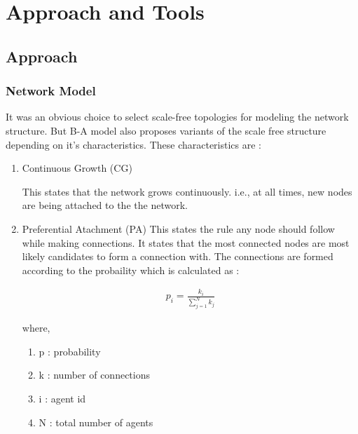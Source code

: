 
\chapter{Approach and Tools} %

\label{Chapter2} %



\section{Approach}


\subsection{Network Model}
\label{sec:model}
It was an obvious choice to select scale-free topologies for modeling the network structure.  But B-A model also proposes variants of the scale free structure depending on it's characteristics. These characteristics are : 

\begin{enumerate}
\item Continuous Growth (CG)

This states that the network grows continuously. i.e., at all times, new nodes are being attached to the the network.


\item Preferential Atachment (PA)
This states the rule any node should follow while making connections. It states that the most connected nodes are most likely candidates to form a connection with.
The connections are formed according to the probaility which is calculated as :

\begin{eqnarray}
 p_i = \frac{k_i}{\sum_{j=1}^{N} k_j} 
\label{eqn:PA}
\end{eqnarray}


where, 

\begin{enumerate}
\item p : probability 
\item k : number of connections 
\item i : agent id 
\item N : total number of agents 
\end{enumerate}

\end{enumerate} 

